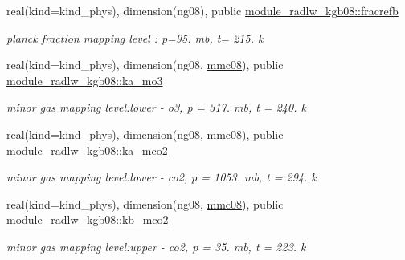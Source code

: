 \begin{DoxyCompactItemize}
real(kind=kind\+\_\+phys), dimension(ng08), public \hyperlink{group__module__radlw__kgbnn_ga0ae7e4c01034a2b95c03b041537b962e}{module\+\_\+radlw\+\_\+kgb08\+::fracrefb}
\begin{DoxyCompactList}\small\item\em planck fraction mapping level \+: p=95. mb, t= 215. k \end{DoxyCompactList}\item 
\mbox{\label{group__module__radlw__kgbnn_ga7dec65e880c278f44419c1ae01490eae}} 
real(kind=kind\+\_\+phys), dimension(ng08, \hyperlink{group__module__radlw__kgbnn_ga9e3bfc1880221c18fa07817eb62bcc47}{mmc08}), public \hyperlink{group__module__radlw__kgbnn_ga7dec65e880c278f44419c1ae01490eae}{module\+\_\+radlw\+\_\+kgb08\+::ka\+\_\+mo3}
\begin{DoxyCompactList}\small\item\em minor gas mapping level\+:lower -\/ o3, p = 317. mb, t = 240. k \end{DoxyCompactList}\item 
\mbox{\label{group__module__radlw__kgbnn_ga0fcd13503b3253ec6aab0aa52056f634}} 
real(kind=kind\+\_\+phys), dimension(ng08, \hyperlink{group__module__radlw__kgbnn_ga9e3bfc1880221c18fa07817eb62bcc47}{mmc08}), public \hyperlink{group__module__radlw__kgbnn_ga0fcd13503b3253ec6aab0aa52056f634}{module\+\_\+radlw\+\_\+kgb08\+::ka\+\_\+mco2}
\begin{DoxyCompactList}\small\item\em minor gas mapping level\+:lower -\/ co2, p = 1053. mb, t = 294. k \end{DoxyCompactList}\item 
\mbox{\label{group__module__radlw__kgbnn_ga9a85770aee1b88b9323d9466c1772ec4}} 
real(kind=kind\+\_\+phys), dimension(ng08, \hyperlink{group__module__radlw__kgbnn_ga9e3bfc1880221c18fa07817eb62bcc47}{mmc08}), public \hyperlink{group__module__radlw__kgbnn_ga9a85770aee1b88b9323d9466c1772ec4}{module\+\_\+radlw\+\_\+kgb08\+::kb\+\_\+mco2}
\begin{DoxyCompactList}\small\item\em minor gas mapping level\+:upper -\/ co2, p = 35. mb, t = 223. k \end{DoxyCompactList}\item 
\mbox{\label{group__module__radlw__kgbnn_ga010239f14788bc1ed9953133e30a62fd}} 

\end{DoxyCompactItemize}
